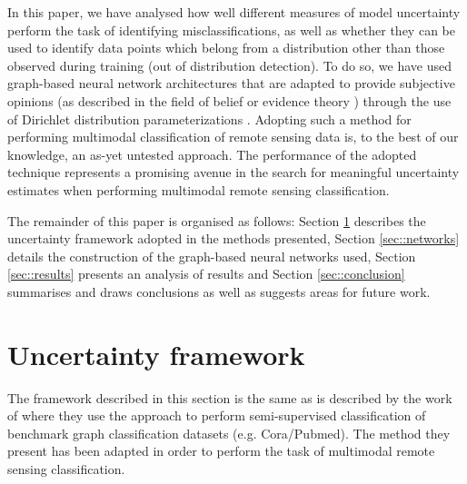 \documentclass[
twocolumn,
]{ceurart}
\begin{document}
In this paper, we have analysed how well different measures of model uncertainty perform the task of identifying misclassifications, as well as whether they can be used to identify data points which belong from a distribution other than those observed during training (out of distribution detection).
To do so, we have used graph-based neural network architectures that are adapted to provide subjective opinions (as described in the field of belief or evidence theory \cite{Josang2018}) through the use of Dirichlet distribution parameterizations \cite{Kipf2017, ZhaoXujiang2020}.
Adopting such a method for performing multimodal classification of remote sensing data is, to the best of our knowledge, an as-yet untested approach. The performance of the adopted technique represents a promising avenue in the search for meaningful uncertainty estimates when performing multimodal remote sensing classification.

The remainder of this paper is organised as follows: Section \ref{sec::unc_framework} describes the uncertainty framework adopted in the methods presented, Section \ref{sec::networks} details the construction of the graph-based neural networks used, Section \ref{sec::results} presents an analysis of results and Section \ref{sec::conclusion} summarises and draws conclusions as well as suggests areas for future work.

\section{Uncertainty framework}
\label{sec::unc_framework}

The framework described in this section is the same as is described by the work of \cite{ZhaoXujiang2020} where they use the approach to perform semi-supervised classification of benchmark graph classification datasets (e.g. Cora/Pubmed). The method they present has been adapted in order to perform the task of multimodal remote sensing classification.
\end{document}
